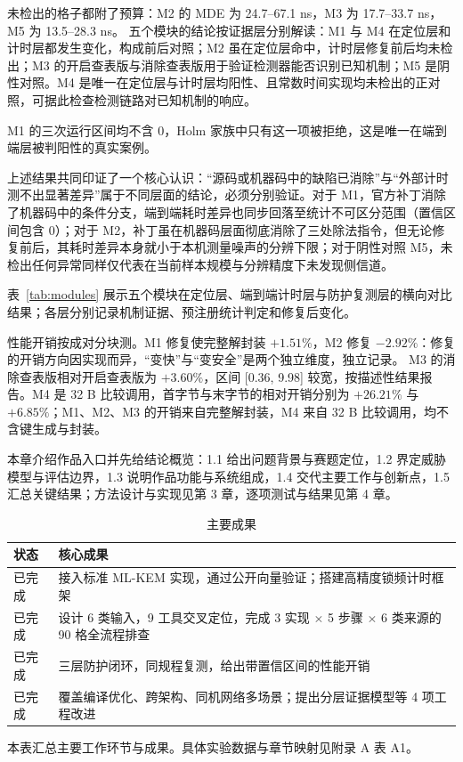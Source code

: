 未检出的格子都附了预算：M2 的 MDE 为 24.7--67.1 ns，M3 为 17.7--33.7 ns，M5 为 13.5--28.3 ns。%
五个模块的结论按证据层分别解读：M1 与 M4 在定位层和计时层都发生变化，构成前后对照；M2 虽在定位层命中，计时层修复前后均未检出；M3 的开启查表版与消除查表版用于验证检测器能否识别已知机制；M5 是阴性对照。M4 是唯一在定位层与计时层均阳性、且常数时间实现均未检出的正对照，可据此检查检测链路对已知机制的响应。

M1 的三次运行区间均不含 0，Holm 家族中只有这一项被拒绝，这是唯一在端到端层被判阳性的真实案例。%

上述结果共同印证了一个核心认识：“源码或机器码中的缺陷已消除”与“外部计时测不出显著差异”属于不同层面的结论，必须分别验证。对于 M1，官方补丁消除了机器码中的条件分支，端到端耗时差异也同步回落至统计不可区分范围（置信区间包含 0）；对于 M2，补丁虽在机器码层面彻底消除了三处除法指令，但无论修复前后，其耗时差异本身就小于本机测量噪声的分辨下限；对于阴性对照 M5，未检出任何异常同样仅代表在当前样本规模与分辨精度下未发现侧信道。

表~\ref{tab:modules} 展示五个模块在定位层、端到端计时层与防护复测层的横向对比结果；各层分别记录机制证据、预注册统计判定和修复后变化。

性能开销按成对分块测。M1 修复使完整解封装 $+1.51\%$，M2 修复 $-2.92\%$：修复的开销方向因实现而异，“变快”与“变安全”是两个独立维度，独立记录。%
M3 的消除查表版相对开启查表版为 $+3.60\%$，区间 [0.36, 9.98] 较宽，按描述性结果报告。M4 是 32 B 比较调用，首字节与末字节的相对开销分别为 $+26.21\%$ 与 $+6.85\%$；M1、M2、M3 的开销来自完整解封装，M4 来自 32 B 比较调用，均不含键生成与封装。

本章介绍作品入口并先给结论概览：1.1 给出问题背景与赛题定位，1.2 界定威胁模型与评估边界，1.3 说明作品功能与系统组成，1.4 交代主要工作与创新点，1.5 汇总关键结果；方法设计与实现见第 3 章，逐项测试与结果见第 4 章。

\begin{table}[H]
\centering
\caption{主要成果}
\label{tab:req_summary}
{\footnotesize
\renewcommand{\arraystretch}{1.15}
\begin{tabularx}{\textwidth}{|>{\centering\arraybackslash}p{2.2cm}|>{\raggedright\arraybackslash}X|}
\hline
\textbf{状态} & \textbf{核心成果} \\
\hline
已完成 & 接入标准 ML-KEM 实现，通过公开向量验证；搭建高精度锁频计时框架 \\
\hline
已完成 & 设计 6 类输入，9 工具交叉定位，完成 3 实现 $\times$ 5 步骤 $\times$ 6 类来源的 90 格全流程排查 \\
\hline
已完成 & 三层防护闭环，同规程复测，给出带置信区间的性能开销 \\
\hline
已完成 & 覆盖编译优化、跨架构、同机网络多场景；提出分层证据模型等 4 项工程改进 \\
\hline
\end{tabularx}
{\footnotesize 本表汇总主要工作环节与成果。具体实验数据与章节映射见附录 A 表 A1。}
}
\end{table}
